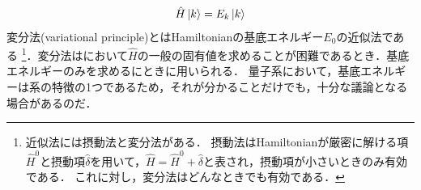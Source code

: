 \documentclass{report}
\begin{document}
  \begin{align}
    \hat{H}\ket{k} = E_k\ket{k}\label{SE}
  \end{align}
  変分法(variational principle)とはHamiltonianの基底エネルギー$E_0$の近似法である
  \footnote{
    近似法には摂動法と変分法がある．
    摂動法はHamiltonianが厳密に解ける項$\hat{H}^0$と摂動項$\hat{\delta}$を用いて，$\hat{H}=\hat{H}^0+\hat{\delta}$と表され，摂動項が小さいときのみ有効である．
    これに対し，変分法はどんなときでも有効である．
  }．変分法はにおいて$\hat{H}$の一般の固有値を求めることが困難であるとき．基底エネルギーのみを求めるにときに用いられる．
  量子系において，基底エネルギーは系の特徴の1つであるため，それが分かることだけでも，十分な議論となる場合があるのだ．
\end{document}
